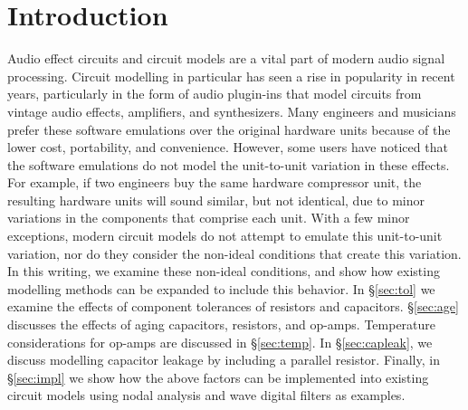 \documentclass[twoside,a4paper]{article}
\title{\papertitle}
\affiliation{
\paperauthorA \, \thanks{}}
{\href{http://ccrma.stanford.edu}{Center for Computer Research in Music and Acoustics} \\ Stanford University \\ Palo Alto, CA \\ {\tt \href{mailto:jatin@ccrma.stanford.edu}{jatin@ccrma.stanford.edu}}}
\newif\ifpdf
\begin{document}
\ifpdf %
  \DeclareGraphicsExtensions{.png,.jpg,.pdf}
\else  %
\fi

\maketitle
%
\begin{abstract}
Traditional circuit modelling methods typically assume ideal
circuit components. Real world audio circuits exhibit
variations in behavior due to non-ideal factors including
component tolerances, operating temperature, and aging.
We present a brief discussion of each of these non-ideal
factors for resistors, capacitors, and operational amplifiers
(op-amps), and show how they each individually affect the
behavior of a circuit model. We present models of Sallen-Key
lowpass filter and diode clipper circuits that incorporate all
of the non-ideal factors together.
\end{abstract}

\section{Introduction} \label{sec:intro}
%
Audio effect circuits and circuit models are a vital part
of modern audio signal processing. Circuit modelling in
particular has seen a rise in popularity in recent years,
particularly in the form of audio plugin-ins that model
circuits from vintage audio effects, amplifiers, and synthesizers.
Many engineers and musicians prefer these software emulations over
the original hardware units because of the lower cost, portability,
and convenience. However, some users have noticed that the software
emulations do not model the unit-to-unit variation in these effects.
For example, if two engineers buy the same hardware compressor unit,
the resulting hardware units will sound similar, but not identical,
due to minor variations in the components that comprise each unit.
With a few minor exceptions, modern circuit models do not attempt to
emulate this unit-to-unit variation, nor do they consider the non-ideal
conditions that create this variation.
\newline\newline
In this writing, we examine these non-ideal conditions, and show how
existing modelling methods can be expanded to include this behavior.
In \S\ref{sec:tol} we examine the effects of component tolerances of resistors
and capacitors. \S\ref{sec:age} discusses the effects of aging capacitors,
resistors, and op-amps. Temperature considerations for
op-amps are discussed in \S\ref{sec:temp}. In \S\ref{sec:capleak}, we
discuss modelling capacitor leakage by including a parallel resistor.
Finally, in \S\ref{sec:impl} we show how the above factors can be
implemented into existing circuit models using nodal analysis and wave
digital filters as examples.
\end{document}
